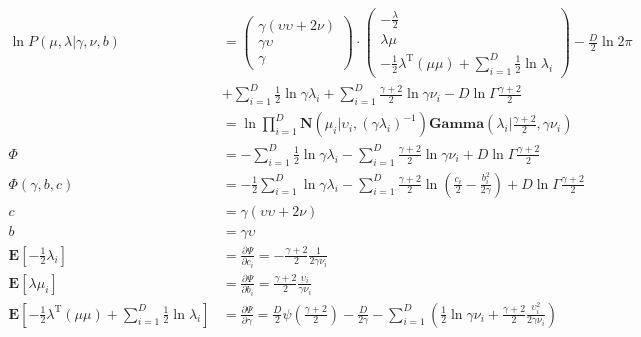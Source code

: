\documentclass{article}
\begin{document}
$$
\begin{aligned}
\ln P(\mu,\lambda | \gamma, \nu, b) &=
\left(
    \begin{aligned}
        \gamma(\upsilon\upsilon + 2\nu)\\
        \gamma \upsilon\\
        \gamma
    \end{aligned}
\right)
\cdot
\left(
    \begin{aligned}
        - \frac{\lambda}{2}\\
        \lambda \mu\\
        -\frac{1}{2}\lambda ^ \mathrm{T} (\mu \mu) + \sum_{i=1}^{D}\frac{1}{2} \ln \lambda_i
    \end{aligned}
\right)
- \frac{D}{2}\ln2\pi\\
&+ \sum_{i=1}^{D}\frac{1}{2}\ln\gamma\lambda_i
+ \sum_{i=1}^{D}\frac{\gamma+2}{2}\ln \gamma \nu_i
- D\ln\Gamma\frac{\gamma + 2}{2}\\
&= \ln\prod_{i=1}^{D}\textbf{N}(\mu_i|\upsilon_i, (\gamma \lambda_i)^{-1}) \textbf{Gamma}(\lambda_i | \frac{\gamma + 2}{2}, \gamma\nu_i)\\
\Phi
    &= -\sum_{i=1}^{D}\frac{1}{2}\ln\gamma\lambda_i
    - \sum_{i=1}^{D}\frac{\gamma+2}{2}\ln \gamma \nu_i
    + D\ln\Gamma\frac{\gamma + 2}{2}\\
\Phi(\gamma, b, c)
    &= -\frac{1}{2}\sum_{i=1}^{D}\ln\gamma\lambda_i - \sum_{i=1}^{D}\frac{\gamma+2}{2}\ln(\frac{c_i}{2}-\frac{b_i^2}{2\gamma})+D\ln\Gamma\frac{\gamma+2}{2}\\
c
    &= \gamma(\upsilon\upsilon + 2\nu)\\
b   &= \gamma\upsilon\\
\textbf{E}[{-\frac{1}{2}\lambda_i}]
    &= \frac{\partial\Psi}{\partial c_i} = -\frac{\gamma + 2}{2}\frac{1}{2\gamma\nu_i}\\
\textbf{E}[{\lambda \mu_i}]
    &= \frac{\partial\Psi}{\partial b_i} = \frac{\gamma + 2}{2}\frac{\upsilon_i}{\gamma\nu_i}\\
\textbf{E}[{-\frac{1}{2}\lambda ^ \mathrm{T} (\mu \mu) + \sum_{i=1}^{D}\frac{1}{2} \ln \lambda_i}]
    &= \frac{\partial\Psi}{\partial \gamma} = \frac{D}{2} \psi(\frac{\gamma + 2}{2}) - \frac{D}{2\gamma} - \sum_{i=1}^{D}(\frac{1}{2}\ln\gamma\nu_i + \frac{\gamma+2}{2}\frac{\upsilon_i^2}{2\gamma\nu_i})
\end{aligned}
$$
\end{document}
